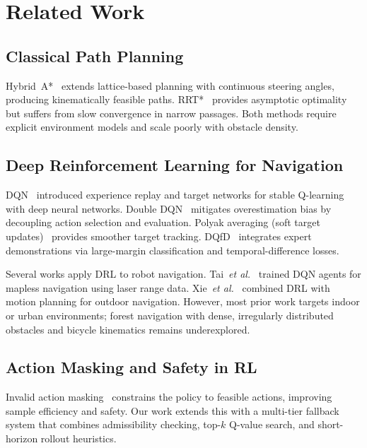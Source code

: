 \documentclass[conference]{IEEEtran}
\newcommand{\etal}{\textit{et al.}}
\begin{document}
\section{Related Work}\label{sec:related}

\subsection{Classical Path Planning}

Hybrid~A*~\cite{dolgov2010path} extends lattice-based planning with continuous steering angles, producing kinematically feasible paths.
RRT*~\cite{karaman2011sampling} provides asymptotic optimality but suffers from slow convergence in narrow passages.
Both methods require explicit environment models and scale poorly with obstacle density.

\subsection{Deep Reinforcement Learning for Navigation}

DQN~\cite{mnih2015human} introduced experience replay and target networks for stable Q-learning with deep neural networks.
Double DQN~\cite{van2016deep} mitigates overestimation bias by decoupling action selection and evaluation.
Polyak averaging (soft target updates)~\cite{lillicrap2015continuous} provides smoother target tracking.
DQfD~\cite{hester2018deep} integrates expert demonstrations via large-margin classification and temporal-difference losses.

Several works apply DRL to robot navigation.
Tai~\etal~\cite{tai2017virtual} trained DQN agents for mapless navigation using laser range data.
Xie~\etal~\cite{xie2018learning} combined DRL with motion planning for outdoor navigation.
However, most prior work targets indoor or urban environments; forest navigation with dense, irregularly distributed obstacles and bicycle kinematics remains underexplored.

\subsection{Action Masking and Safety in RL}

Invalid action masking~\cite{huang2020closer} constrains the policy to feasible actions, improving sample efficiency and safety.
Our work extends this with a multi-tier fallback system that combines admissibility checking, top-$k$ Q-value search, and short-horizon rollout heuristics.
\end{document}
